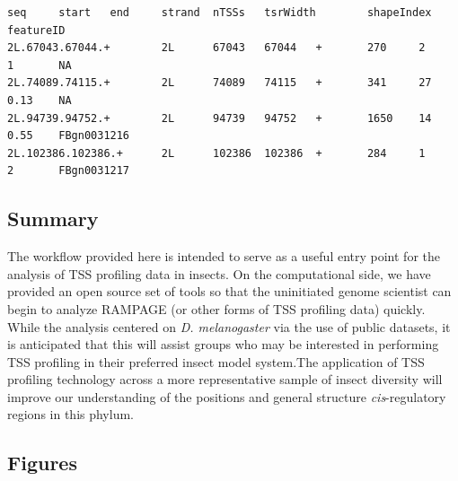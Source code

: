 \documentclass[runningheads,a4paper]{llncs}
\begin{document}
\begin{linenumbers}
\noindent
\begin{verbatim}
seq     start   end     strand  nTSSs   tsrWidth        shapeIndex      featureID
2L.67043.67044.+        2L      67043   67044   +       270     2       1       NA
2L.74089.74115.+        2L      74089   74115   +       341     27      0.13    NA
2L.94739.94752.+        2L      94739   94752   +       1650    14      0.55    FBgn0031216
2L.102386.102386.+      2L      102386  102386  +       284     1       2       FBgn0031217
\end{verbatim}

\subsection{Summary}
The workflow provided here is intended to serve as a useful entry point for the analysis of TSS profiling data in insects. 
On the computational side, we have provided an open source set of tools so that the uninitiated genome scientist can begin to analyze RAMPAGE (or other forms of TSS profiling data) quickly.
While the analysis centered on \textit{D. melanogaster} via the use of public datasets, it is anticipated that this will assist groups who may be interested in performing TSS profiling in their preferred insect model system.The application of TSS profiling technology across a more representative sample of insect diversity will improve our understanding of the positions and general structure \textit{cis}-regulatory regions in this phylum.

\subsection{Figures}


\end{linenumbers}
\end{document}
